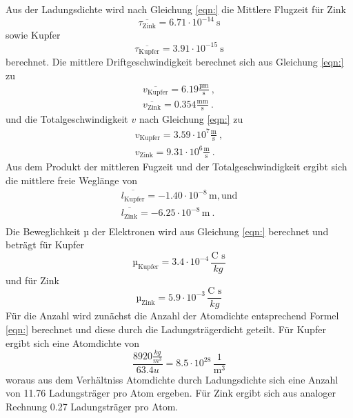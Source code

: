 Aus der Ladungsdichte wird nach Gleichung \ref{eqn:} die Mittlere Flugzeit für Zink
\begin{equation}
  \overline{\tau_\text{Zink}} = 6.71 \cdot 10^{-14} \ \text{s}
  \label{eqn:tZ}
\end{equation}
sowie Kupfer
\begin{equation}
  \overline{\tau_\text{Kupfer}} = 3.91 \cdot 10^{-15} \ \text{s}
    \label{eqn:tK}
\end{equation}
berechnet. Die mittlere Driftgeschwindigkeit  berechnet sich aus Gleichung \ref{eqn:} zu 
\begin{eqnarray}
  \overline{v_\text{Kupfer}} = 6.19 \frac{\text{µm}}{\text{s}} \ , \\
  \overline{v_\text{Zink}} = 0.354 \frac{\text{mm}}{\text{s}} \ .
\end{eqnarray}
und die Totalgeschwindigkeit $v$ nach Gleichung \ref{eqn:} zu
\begin{eqnarray}
  v_\text{Kupfer} = 3.59 \cdot 10^7 \frac{\text{m}}{\text{s}} \ , \\
  v_\text{Zink} = 9.31 \cdot 10^6 \frac{\text{m}}{\text{s}} \ .
\end{eqnarray}
Aus dem Produkt der mittleren Fugzeit und der Totalgeschwindigkeit ergibt sich die mittlere freie Weglänge von 
\begin{eqnarray}
  \overline{l_\text{Kupfer}} = -1.40 \cdot 10^{-8} \, \text{m} , \text{und} \\
  \overline{l_\text{Zink}} = -6.25 \cdot 10^{-8} \, \text{m} \ .\\
\end{eqnarray}
Die Beweglichkeit $µ$ der Elektronen wird aus Gleichung \ref{eqn:} berechnet und beträgt für Kupfer 
\begin{equation}
  µ_\text{Kupfer} = 3.4 \cdot 10^{-4} \, \frac{\text{C s}}{kg}
\end{equation}
und für Zink
\begin{equation}
  µ_\text{Zink} = 5.9 \cdot 10^{-3} \, \frac{\text{C s}}{kg}
\end{equation}
Für die Anzahl wird zunächst die Anzahl der Atomdichte entsprechend Formel \ref{eqn:} berechnet und diese durch die Ladungsträgerdicht geteilt. Für Kupfer ergibt sich eine Atomdichte von 
\begin{equation}
  \frac{8920 \frac{kg}{m^3}}{63.4 u} = 8.5 \cdot 10^{28} \, \frac{1}{\text{m}^3}
\end{equation} 
woraus aus dem Verhältniss Atomdichte durch Ladungsdichte sich eine Anzahl von 11.76 Ladungsträger pro Atom ergeben. Für Zink ergibt sich aus analoger Rechnung 0.27 Ladungsträger pro Atom.
